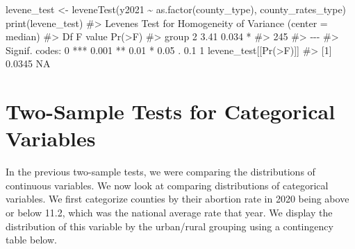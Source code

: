 \documentclass[
  letterpaper,
]{latex/krantz}
\makeatletter
\newenvironment{Shaded}{\begin{snugshade}}{\end{snugshade}}
\newcommand{\CommentTok}[1]{\textcolor[rgb]{0.37,0.37,0.37}{#1}}
\newcommand{\FloatTok}[1]{\textcolor[rgb]{0.68,0.00,0.00}{#1}}
\newcommand{\FunctionTok}[1]{\textcolor[rgb]{0.28,0.35,0.67}{#1}}
\newcommand{\NormalTok}[1]{\textcolor[rgb]{0.00,0.23,0.31}{#1}}
\newcommand{\OtherTok}[1]{\textcolor[rgb]{0.00,0.23,0.31}{#1}}
\newcommand{\SpecialCharTok}[1]{\textcolor[rgb]{0.37,0.37,0.37}{#1}}
\newcommand{\StringTok}[1]{\textcolor[rgb]{0.13,0.47,0.30}{#1}}
\newenvironment{kframe}{%
\medskip{}
\setlength{\fboxsep}{.8em}
 \def\at@end@of@kframe{}%
 \ifinner\ifhmode%
  \def\at@end@of@kframe{\end{minipage}}%
  \begin{minipage}{\columnwidth}%
 \fi\fi%
 \def\FrameCommand##1{\hskip\@totalleftmargin \hskip-\fboxsep
 \colorbox{shadecolor}{##1}\hskip-\fboxsep
     \hskip-\linewidth \hskip-\@totalleftmargin \hskip\columnwidth}%
 \MakeFramed {\advance\hsize-\width
   \@totalleftmargin\z@ \linewidth\hsize
   \@setminipage}}%
 {\par\unskip\endMakeFramed%
 \at@end@of@kframe}
\renewenvironment{Shaded}{\begin{kframe}}{\end{kframe}}
\makeatother
\begin{document}
\begin{Shaded}
\begin{Highlighting}[]
\NormalTok{levene\_test }\OtherTok{\textless{}{-}} \FunctionTok{leveneTest}\NormalTok{(y2021 }\SpecialCharTok{\textasciitilde{}} \FunctionTok{as.factor}\NormalTok{(county\_type), }
\NormalTok{                              county\_rates\_type)}
\FunctionTok{print}\NormalTok{(levene\_test)}
\CommentTok{\#\textgreater{} Levene\textquotesingle{}s Test for Homogeneity of Variance (center = median)}
\CommentTok{\#\textgreater{}        Df F value Pr(\textgreater{}F)  }
\CommentTok{\#\textgreater{} group   2    3.41  0.034 *}
\CommentTok{\#\textgreater{}       245                 }
\CommentTok{\#\textgreater{} {-}{-}{-}}
\CommentTok{\#\textgreater{} Signif. codes:  0 \textquotesingle{}***\textquotesingle{} 0.001 \textquotesingle{}**\textquotesingle{} 0.01 \textquotesingle{}*\textquotesingle{} 0.05 \textquotesingle{}.\textquotesingle{} 0.1 \textquotesingle{} \textquotesingle{} 1}
\NormalTok{levene\_test[[}\StringTok{\textquotesingle{}Pr(\textgreater{}F)\textquotesingle{}}\NormalTok{]]}
\CommentTok{\#\textgreater{} [1] 0.0345     NA}
\end{Highlighting}
\end{Shaded}

\section{\texorpdfstring{Two-Sample Tests for Categorical Variables
}{Two-Sample Tests for Categorical Variables }}\label{two-sample-tests-for-categorical-variables}

In the previous two-sample tests, we were comparing the distributions of
continuous variables. We now look at comparing distributions of
categorical variables. We first categorize counties by their abortion
rate in 2020 being above or below 11.2, which was the national average
rate that year. We display the distribution of this variable by the
urban/rural grouping using a contingency table below.

\begin{Shaded}
\end{Shaded}
\end{document}
